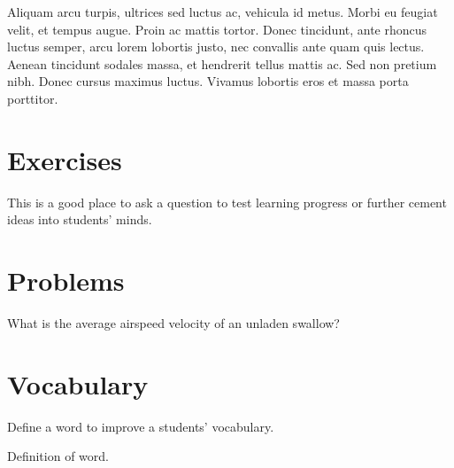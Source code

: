 \documentclass[
	11pt, %
	fleqn, %
	a4paper, %
]{LegrandOrangeBook}
\begin{document}
\begin{example}[Example name] %
	Aliquam arcu turpis, ultrices sed luctus ac, vehicula id metus. Morbi eu feugiat velit, et tempus augue. Proin ac mattis tortor. Donec tincidunt, ante rhoncus luctus semper, arcu lorem lobortis justo, nec convallis ante quam quis lectus. Aenean tincidunt sodales massa, et hendrerit tellus mattis ac. Sed non pretium nibh. Donec cursus maximus luctus. Vivamus lobortis eros et massa porta porttitor.
\end{example}


\section{Exercises}

\begin{exercise} %
	This is a good place to ask a question to test learning progress or further cement ideas into students' minds.
\end{exercise}


\section{Problems}

\begin{problem} %
What is the average airspeed velocity of an unladen swallow?
\end{problem}


\section{Vocabulary}

Define a word to improve a students' vocabulary.

\begin{vocabulary}[Word] %
	Definition of word.
\end{vocabulary}
\end{document}
